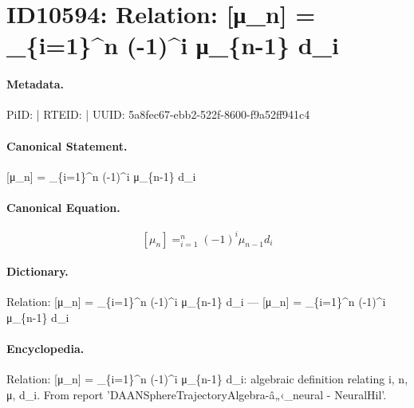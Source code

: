 \section*{ID10594: Relation: [μ\_n] = \_\{i=1\}\textasciicircum{}n (-1)\textasciicircum{}i μ\_\{n-1\} d\_i}
\paragraph{Metadata.}
PiID:  | RTEID:  | UUID: 5a8fec67-ebb2-522f-8600-f9a52ff941c4

\paragraph{Canonical Statement.}
[μ\_n] = \_\{i=1\}\textasciicircum{}n (-1)\textasciicircum{}i μ\_\{n-1\} d\_i

\paragraph{Canonical Equation.}
\[
[μ_n] = _{i=1}^n (-1)^i μ_{n-1}  d_i
\]

\paragraph{Dictionary.}
Relation: [μ\_n] = \_\{i=1\}\textasciicircum{}n (-1)\textasciicircum{}i μ\_\{n-1\} d\_i — [μ\_n] = \_\{i=1\}\textasciicircum{}n (-1)\textasciicircum{}i μ\_\{n-1\}  d\_i

\paragraph{Encyclopedia.}
Relation: [μ\_n] = \_\{i=1\}\textasciicircum{}n (-1)\textasciicircum{}i μ\_\{n-1\} d\_i: algebraic definition relating i, n, μ, d\_i. From report 'DAANSphereTrajectoryAlgebra-â„‹\_neural - NeuralHil'.
